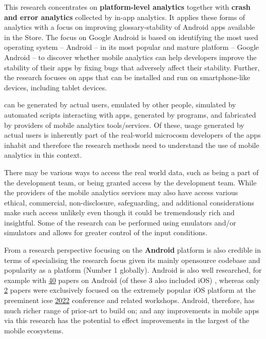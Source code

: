 This research concentrates on \textbf{platform-level analytics} together with \textbf{crash and error analytics} collected by in-app analytics. It applies these forms of analytics with a focus on improving \gls{glossary-stability} of Android apps available in the  Store. The focus on Google Android is based on identifying the most used operating system -- Android -- in its most popular and mature platform -- Google Android -- to discover whether mobile analytics can help developers improve the stability of their apps by fixing bugs that adversely affect their stability. Further, the research focuses on apps that can be installed and run on smartphone-like devices, including tablet devices.

\begin{kaobox}[frametitle=Usage data]
 can be generated by actual users, emulated by other people, simulated by automated scripts interacting with apps, generated by programs, and fabricated by providers of mobile analytics tools/services. Of these, usage generated by actual users is inherently part of the real-world microcosm developers of the apps inhabit and therefore the research methods need to understand the use of mobile analytics in this context. 

There may be various ways to access the real world data, such as being a part of the development team, or being granted access by the development team. While the providers of the mobile analytics services may also have access various ethical, commercial, non-disclosure, safeguarding, and additional considerations make such access unlikely even though it could be tremendously rich and insightful. Some of the research can be performed using emulators and/or simulators and allows for greater control of the input conditions.
\end{kaobox}

From a research perspective focusing on the \textbf{Android} platform is also credible in terms of specialising the research focus given its mainly opensource codebase and popularity as a platform (Number 1 globally). Android is also well researched, for example with 
\href{https://conf.researchr.org/search/icse-2022/android/events}{40} papers on Android (of these 3 also included iOS) %
, whereas only \href{https://conf.researchr.org/search/icse-2022/ios/events}{2} %
papers were exclusively focused on the extremely popular iOS platform at the preeminent \gls{icse} \href{https://conf.resea
rchr.org/home/icse-2022}{2022} conference and related workshops. Android, therefore, has much richer range of prior-art to build on; and any improvements in mobile apps via this research has the potential to effect improvements in the largest of the mobile ecosystems.

